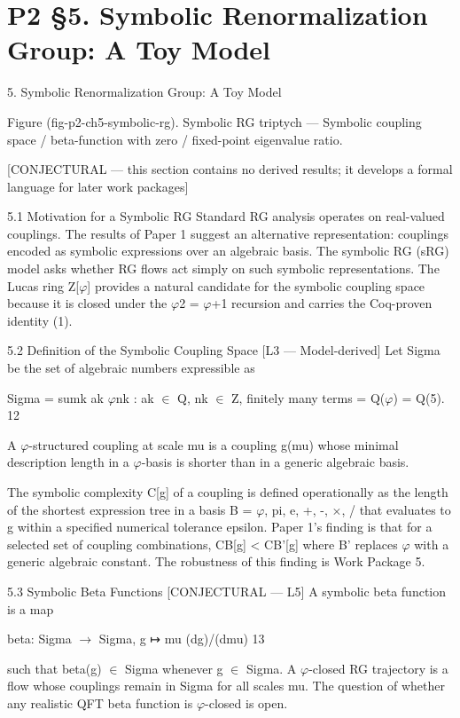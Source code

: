 
\section{P2 §5. Symbolic Renormalization Group: A Toy Model}

5. Symbolic Renormalization Group: A Toy Model

   Figure (fig-p2-ch5-symbolic-rg). Symbolic RG triptych --- Symbolic coupling space / beta-function
                                with zero / fixed-point eigenvalue ratio.

  [CONJECTURAL --- this section contains no derived results; it develops a formal
  language for later work packages]

  5.1 Motivation for a Symbolic RG
  Standard RG analysis operates on real-valued couplings. The results of Paper 1 suggest
  an alternative representation: couplings encoded as symbolic expressions over an
  algebraic basis. The symbolic RG (sRG) model asks whether RG flows act simply on
  such symbolic representations. The Lucas ring Z[$\varphi$] provides a natural candidate for the
  symbolic coupling space because it is closed under the $\varphi$2 = $\varphi$+1 recursion and carries
  the Coq-proven identity (1).

  5.2 Definition of the Symbolic Coupling Space [L3 --- Model-derived]
  Let Sigma be the set of algebraic numbers expressible as

  Sigma = { sumk ak $\varphi$nk : ak $\in$ Q, nk $\in$ Z, finitely many terms } = Q($\varphi$) = Q(5). 12

  A $\varphi$-structured coupling at scale mu is a coupling g(mu) whose minimal description
  length in a $\varphi$-basis is shorter than in a generic algebraic basis.

  The symbolic complexity C[g] of a coupling is defined operationally as the length of the
  shortest expression tree in a basis B = {$\varphi$, pi, e, +, -, $\times$, /} that evaluates to g within a
  specified numerical tolerance epsilon. Paper 1's finding is that for a selected set of
  coupling combinations, CB[g] < CB'[g] where B' replaces $\varphi$ with a generic algebraic
  constant. The robustness of this finding is Work Package 5.

  5.3 Symbolic Beta Functions [CONJECTURAL --- L5]
  A symbolic beta function is a map

  beta: Sigma $\rightarrow$ Sigma, g ↦ mu (dg)/(dmu) 13

  such that beta(g) $\in$ Sigma whenever g $\in$ Sigma. A $\varphi$-closed RG trajectory is a flow
  whose couplings remain in Sigma for all scales mu. The question of whether any
  realistic QFT beta function is $\varphi$-closed is open.

